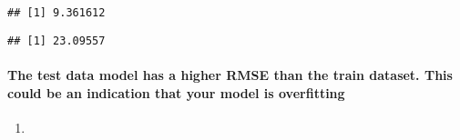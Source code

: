\documentclass[]{article}
\newenvironment{Shaded}{\begin{snugshade}}{\end{snugshade}}
\newcommand{\CommentTok}[1]{\textcolor[rgb]{0.56,0.35,0.01}{\textit{#1}}}
\newcommand{\DataTypeTok}[1]{\textcolor[rgb]{0.13,0.29,0.53}{#1}}
\newcommand{\DecValTok}[1]{\textcolor[rgb]{0.00,0.00,0.81}{#1}}
\newcommand{\KeywordTok}[1]{\textcolor[rgb]{0.13,0.29,0.53}{\textbf{#1}}}
\newcommand{\NormalTok}[1]{#1}
\newcommand{\OperatorTok}[1]{\textcolor[rgb]{0.81,0.36,0.00}{\textbf{#1}}}
\newcommand{\StringTok}[1]{\textcolor[rgb]{0.31,0.60,0.02}{#1}}
\let\oldparagraph\paragraph
\renewcommand{\paragraph}[1]{\oldparagraph{#1}\mbox{}}
\begin{document}
\begin{verbatim}
## [1] 9.361612
\end{verbatim}

\begin{Shaded}
\end{Shaded}

\begin{verbatim}
## [1] 23.09557
\end{verbatim}

\hypertarget{the-test-data-model-has-a-higher-rmse-than-the-train-dataset.-this-could-be-an-indication-that-your-model-is-overfitting}{%
\paragraph{The test data model has a higher RMSE than the train dataset.
This could be an indication that your model is
overfitting}\label{the-test-data-model-has-a-higher-rmse-than-the-train-dataset.-this-could-be-an-indication-that-your-model-is-overfitting}}

\begin{enumerate}
\def\labelenumi{(\alph{enumi})}
\setcounter{enumi}{1}
\item
\end{enumerate}

\begin{Shaded}
\end{Shaded}
\end{document}
